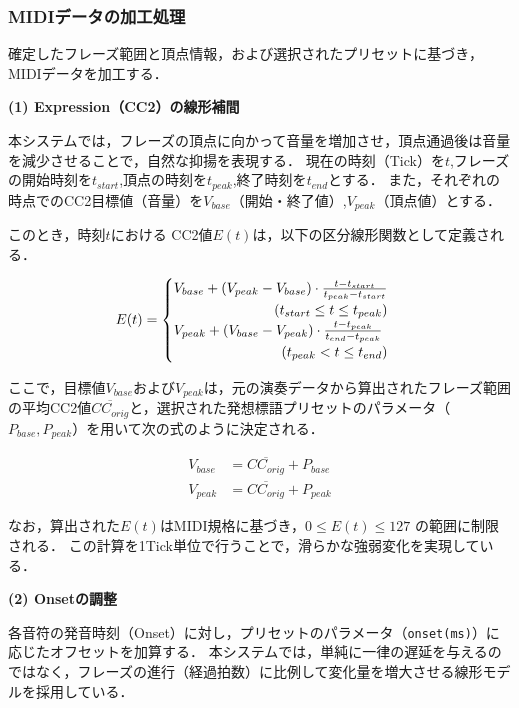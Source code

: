 \subsubsection{MIDIデータの加工処理} \label{sec:Processing}
確定したフレーズ範囲と頂点情報，および選択されたプリセットに基づき，MIDIデータを加工する．

\noindent \textbf{(1) Expression（CC2）の線形補間}

本システムでは，フレーズの頂点に向かって音量を増加させ，頂点通過後は音量を減少させることで，自然な抑揚を表現する．
現在の時刻（Tick）を$t$,フレーズの開始時刻を$t_{start}$,頂点の時刻を$t_{peak}$,終了時刻を$t_{end}$とする．
また，それぞれの時点でのCC2目標値（音量）を$V_{base}$（開始・終了値）,$V_{peak}$（頂点値）とする．

このとき，時刻$t$における CC2値$E(t)$は，以下の区分線形関数として定義される．

\begin{equation}
	E(t) =
	\begin{cases}
		V_{base} + (V_{peak} - V_{base}) \cdot \frac{t - t_{start}}{t_{peak} - t_{start}} \\
		\hfill (t_{start} \le t \le t_{peak})                                             \\
		V_{peak} + (V_{base} - V_{peak}) \cdot \frac{t - t_{peak}}{t_{end} - t_{peak}}    \\
		\hfill (t_{peak} < t \le t_{end})
	\end{cases}
\end{equation}

ここで，目標値$V_{base}$および$V_{peak}$は，元の演奏データから算出されたフレーズ範囲の平均CC2値$\overline{CC_{orig}}$と，選択された発想標語プリセットのパラメータ（$P_{base},P_{peak}$）を用いて次の式のように決定される．

\begin{equation}
	\begin{aligned}
		V_{base} & = \overline{CC_{orig}} + P_{base} \\
		V_{peak} & = \overline{CC_{orig}} + P_{peak}
	\end{aligned}
\end{equation}

なお，算出された$E(t)$はMIDI規格に基づき，$0 \le E(t) \le 127$ の範囲に制限される．
この計算を1Tick単位で行うことで，滑らかな強弱変化を実現している．

\noindent \textbf{(2) Onsetの調整}

各音符の発音時刻（Onset）に対し，プリセットのパラメータ（\texttt{onset(ms)}）に応じたオフセットを加算する．
本システムでは，単純に一律の遅延を与えるのではなく，フレーズの進行（経過拍数）に比例して変化量を増大させる線形モデルを採用している．

